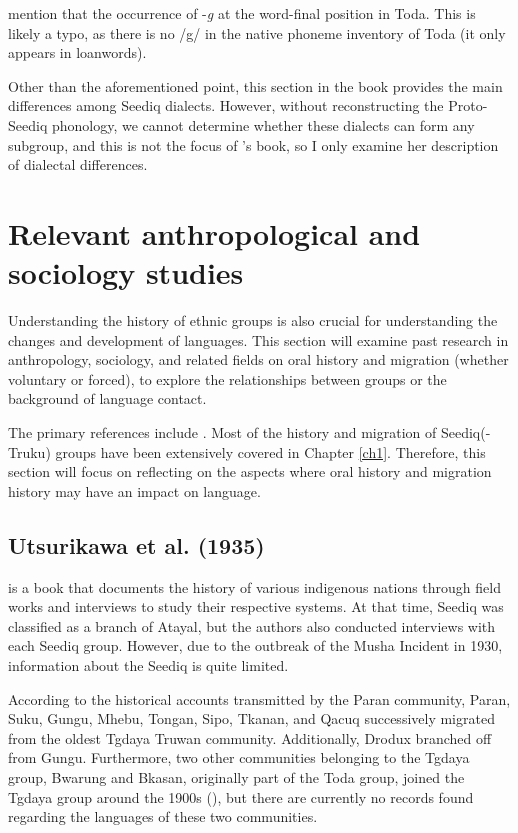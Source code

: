 \textcite[22]{Sung2018Sedgrammar} mention that the occurrence of -\textit{g} at the word-final position in Toda. This is likely a typo, as there is no /g/ in the native phoneme inventory of Toda (it only appears in loanwords). 

Other than the aforementioned point, this section in the book provides the main differences among Seediq dialects. However, without reconstructing the Proto-Seediq phonology, we cannot determine whether these dialects can form any subgroup, and this is not the focus of \citeauthor{Sung2018Sedgrammar}'s book, so I only examine her description of dialectal differences.

\section{Relevant anthropological and sociology studies} \label{sec:anth_lit}

Understanding the history of ethnic groups is also crucial for understanding the changes and development of languages. This section will examine past research in anthropology, sociology, and related fields on oral history and migration (whether voluntary or forced), to explore the relationships between groups or the background of language contact. 

The primary references include \textcites{utsurikawaetal1935}{liao1977Sedtheruy}{liao1978Sedtheruy}{yap2023}. Most of the history and migration of Seediq(-Truku) groups have been extensively covered in Chapter \ref{ch1}. Therefore, this section will focus on reflecting on the aspects where oral history and migration history may have an impact on language.

\subsection{Utsurikawa et al. (1935)}

\textcite{utsurikawaetal1935} is a book that documents the history of various indigenous nations through field works and interviews to study their respective systems. At that time, Seediq was classified as a branch of Atayal, but the authors also conducted interviews with each Seediq group. However, due to the outbreak of the Musha Incident in 1930, information about the Seediq is quite limited.

According to the historical accounts transmitted by the Paran community, Paran, Suku, Gungu, Mhebu, Tongan, Sipo, Tkanan, and Qacuq successively migrated from the oldest Tgdaya Truwan community. Additionally, Drodux branched off from Gungu. Furthermore, two other communities belonging to the Tgdaya group, Bwarung and Bkasan, originally part of the Toda group, joined the Tgdaya group around the 1900s (\cite[146--157]{TengChian2023musha}), but there are currently no records found regarding the languages of these two communities.

